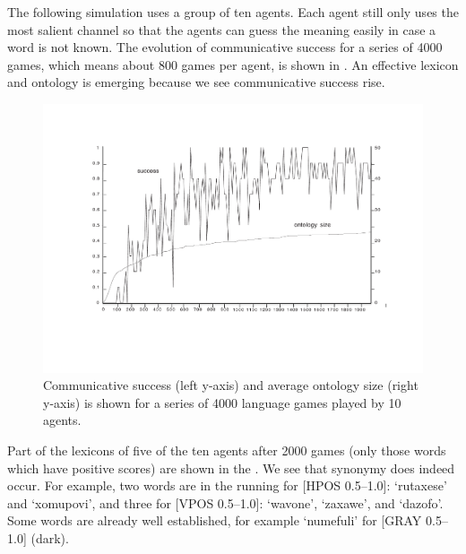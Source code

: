 The following simulation uses a group of ten agents. 
Each agent still only uses the most salient channel so that 
the agents can guess the meaning easily in case a word is not known. 
The evolution of communicative success for a series of 
4000 games, which means about 800 games per agent, 
is shown in . 
An effective lexicon and ontology is 
emerging because we see communicative success rise. 


\begin{figure}[htbp]
  \centerline{\includegraphics[width=\textwidth]{chap6/figs/gsucc2.pdf}}
\caption{\label{gsucc2}Communicative 
success (left y-axis) and average ontology size 
(right y-axis) is shown for a series of 4000
language games played by 10 agents.} 
\end{figure}

Part of the lexicons of five of the ten agents after 2000 games 
(only those words which have positive scores) are shown in the 
. We see that synonymy does indeed occur. For
example, two words are in the 
running for [HPOS 0.5–1.0]: `rutaxese' and `xomupovi', and 
three for [VPOS 0.5–1.0]: `wavone', `zaxawe', and 
`dazofo'. Some words are already well established, for
example `numefuli' for [GRAY 0.5–1.0] (dark). 


